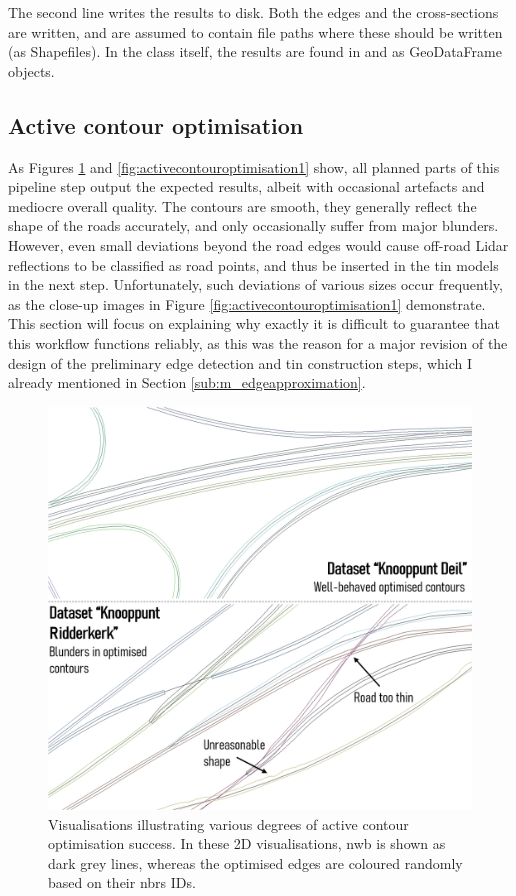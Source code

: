 The second line writes the results to disk. Both the edges and the cross-sections are written,  and  are assumed to contain file paths where these should be written (as Shapefiles). In the class itself, the results are found in  and  as GeoDataFrame objects.

\subsection{Active contour optimisation}
\label{sub:r_activecontours}

As Figures \ref{fig:activecontouroptimisation0} and \ref{fig:activecontouroptimisation1} show, all planned parts of this pipeline step output the expected results, albeit with occasional artefacts and mediocre overall quality. The contours are smooth, they generally reflect the shape of the roads accurately, and only occasionally suffer from major blunders. However, even small deviations beyond the road edges would cause off-road Lidar reflections to be classified as road points, and thus be inserted in the \ac{tin} models in the next step. Unfortunately, such deviations of various sizes occur frequently, as the close-up images in Figure \ref{fig:activecontouroptimisation1} demonstrate. This section will focus on explaining why exactly it is difficult to guarantee that this workflow functions reliably, as this was the reason for a major revision of the design of the preliminary edge detection and \ac{tin} construction steps, which I already mentioned in Section \ref{sub:m_edgeapproximation}.

\begin{figure}[h]
    \centering
    \includegraphics[width=0.84\linewidth]{final_report/figs/activecontouroptimisation0.png}
    \caption[Renders illustrating the results of active contour optimisation]{Visualisations illustrating various degrees of active contour optimisation success. In these 2D visualisations, \ac{nwb} is shown as dark grey lines, whereas the optimised edges are coloured randomly based on their \ac{nbrs} IDs.}
    \label{fig:activecontouroptimisation0}
\end{figure}

